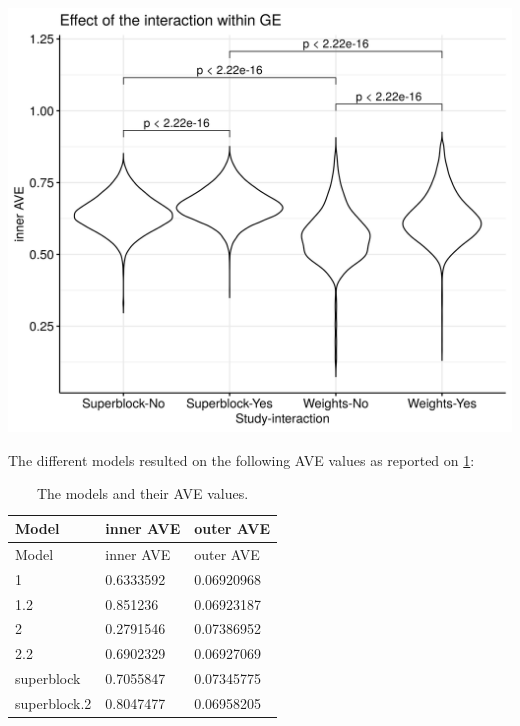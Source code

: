 \documentclass[
  a4paper,
]{book}
\let\origfigure\figure
\let\endorigfigure\endfigure
\renewenvironment{figure}[1][2] {
    \expandafter\origfigure\expandafter[!ht]
} {
    \endorigfigure
}
\begin{document}
\begin{figure}
\includegraphics[width=1\linewidth]{images/pugets-weights} \caption[Effect of superblock and weights on the inner AVE on Puget's dataset.]{Effect of superblock and weights on the inner AVE on Puget's dataset. Designs with the superblock showed higher inner AVe scores than without it. Interaction yes/no indicates RNA and RNA interaction.}\label{fig:puget-weights}
\end{figure}

The different models resulted on the following AVE values as reported on \ref{tab:puget-models-ave}:

\begin{longtable}[]{@{}lll@{}}
\caption{\label{tab:puget-models-ave} The models and their AVE values.}\tabularnewline
\toprule
Model & inner AVE & outer AVE \\
\midrule
\endfirsthead
\toprule
Model & inner AVE & outer AVE \\
\midrule
\endhead
1 & 0.6333592 & 0.06920968 \\
1.2 & 0.851236 & 0.06923187 \\
2 & 0.2791546 & 0.07386952 \\
2.2 & 0.6902329 & 0.06927069 \\
superblock & 0.7055847 & 0.07345775 \\
superblock.2 & 0.8047477 & 0.06958205 \\
\bottomrule
\end{longtable}
\end{document}
